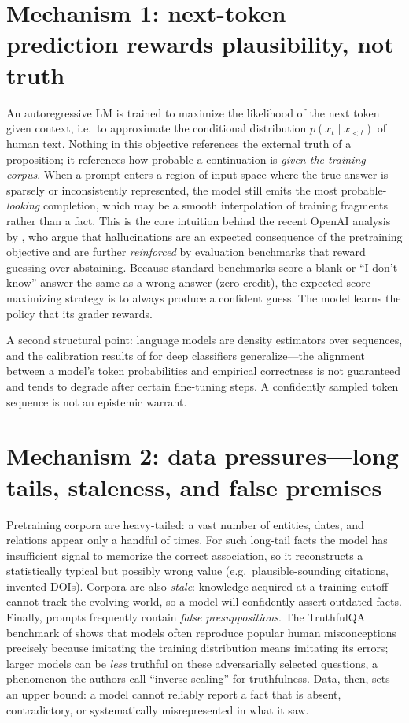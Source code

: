 \documentclass[11pt]{article}
\begin{document}
\section{Mechanism 1: next-token prediction rewards plausibility, not truth}
An autoregressive LM is trained to maximize the likelihood of the next token given context, i.e.\ to approximate the conditional distribution $p(x_t \mid x_{<t})$ of human text. Nothing in this objective references the external truth of a proposition; it references how probable a continuation is \emph{given the training corpus}. When a prompt enters a region of input space where the true answer is sparsely or inconsistently represented, the model still emits the most probable-\emph{looking} completion, which may be a smooth interpolation of training fragments rather than a fact. This is the core intuition behind the recent OpenAI analysis by \citet{kalai2025hallucinate}, who argue that hallucinations are an expected consequence of the pretraining objective and are further \emph{reinforced} by evaluation benchmarks that reward guessing over abstaining. Because standard benchmarks score a blank or ``I don't know'' answer the same as a wrong answer (zero credit), the expected-score-maximizing strategy is to always produce a confident guess. The model learns the policy that its grader rewards.

A second structural point: language models are density estimators over sequences, and the calibration results of \citet{guo2017calibration} for deep classifiers generalize---the alignment between a model's token probabilities and empirical correctness is not guaranteed and tends to degrade after certain fine-tuning steps. A confidently sampled token sequence is not an epistemic warrant.

\section{Mechanism 2: data pressures---long tails, staleness, and false premises}
Pretraining corpora are heavy-tailed: a vast number of entities, dates, and relations appear only a handful of times. For such long-tail facts the model has insufficient signal to memorize the correct association, so it reconstructs a statistically typical but possibly wrong value (e.g.\ plausible-sounding citations, invented DOIs). Corpora are also \emph{stale}: knowledge acquired at a training cutoff cannot track the evolving world, so a model will confidently assert outdated facts. Finally, prompts frequently contain \emph{false presuppositions}. The TruthfulQA benchmark of \citet{lin2022truthfulqa} shows that models often reproduce popular human misconceptions precisely because imitating the training distribution means imitating its errors; larger models can be \emph{less} truthful on these adversarially selected questions, a phenomenon the authors call ``inverse scaling'' for truthfulness. Data, then, sets an upper bound: a model cannot reliably report a fact that is absent, contradictory, or systematically misrepresented in what it saw.
\end{document}
